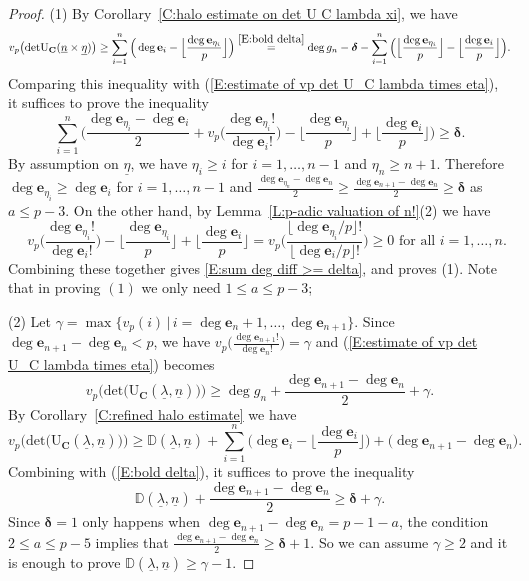 \documentclass[12pt]{amsart}
\theoremstyle{definition}
\numberwithin{equation}{subsection}
\def\DD{\mathbb{D}}
\def\bfe{\mathbf{e}}
\def\bfC{\mathbf{C}}
\def\rmU{\mathrm{U}}
\renewcommand{\det}{\mathrm{det}}
\begin{document}
\begin{proof}
(1) By Corollary~\ref{C:halo estimate on det U C lambda xi}, we have 
		$$
		v_p\big(\det \rmU_{\bfC}(\underline n \times  \underline \eta)\big) \geq  \sum_{i=1}^{n} \Big( \deg \bfe_i - \Big\lfloor \frac{\deg \bfe_{\eta_i}}p\Big\rfloor \Big)\stackrel{\eqref{E:bold delta}}=\deg g_n- \boldsymbol{\delta} -\sum_{i=1}^n\Big( \Big\lfloor \frac{\deg \bfe_{\eta_i}}p\Big\rfloor -\Big\lfloor\frac{\deg \bfe_{i}}p\Big\rfloor \Big).
		$$
		Comparing this inequality with (\ref{E:estimate of vp det U_C lambda times eta}), it suffices to prove the inequality
\begin{equation}
\label{E:sum deg diff >= delta}
\sum_{i=1}^n\bigg(\frac{\deg \bfe_{\eta_i} - \deg \bfe_{i}}2 +  v_p \Big( \frac{\deg \bfe_{\eta_i}!}{\deg \bfe_{i}!}\Big)- \Big\lfloor \frac{\deg \bfe_{\eta_i}}p\Big\rfloor +\Big\lfloor\frac{\deg \bfe_{i}}p\Big\rfloor \bigg) \geq \boldsymbol{\delta}.
\end{equation}
		By assumption on $\underline \eta$, we have $\eta_i\geq i$ for $i=1,\dots, n-1$ and $\eta_n\geq n+1$. Therefore $\deg\bfe_{\eta_i}\geq \deg \bfe_i$ for $i=1,\dots, n-1$ and $\frac{\deg \bfe_{\eta_n}-\deg \bfe_n}2\geq \frac{\deg \bfe_{n+1}-\deg \bfe_n}2 \geq \boldsymbol{\delta}$ as $a\leq p-3$. On the other hand, by Lemma~\ref{L:p-adic valuation of n!}(2)  we have 
		\[
		\quad v_p\Big( \frac{\deg \bfe_{\eta_i}!}{\deg \bfe_i!}\Big) - \Big\lfloor \frac{\deg \bfe_{\eta_i}}p\Big\rfloor +\Big\lfloor\frac{\deg \bfe_{i}}p\Big\rfloor = v_p\Big( \frac{\lfloor\deg \bfe_{\eta_i}/p\rfloor!}{\lfloor\deg  \bfe_i/p\rfloor!}\Big)\geq 0 \text{~for all~}i=1,\dots,n.
		\]
		Combining these together gives \eqref{E:sum deg diff >= delta}, and proves (1). Note that in proving $(1)$ we only need $1\leq a\leq p-3$;
        
(2) Let $\gamma=\max\{v_p(i)\,|\,i=\deg\bfe_n+1,\dots, \deg \bfe_{n+1} \}$. Since $\deg \bfe_{n+1}-\deg \bfe_n<p$, we have $v_p\big(\frac{\deg \bfe_{n+1}!}{\deg \bfe_n!} \big)=\gamma$ and (\ref{E:estimate of vp det U_C lambda times eta}) becomes
		\begin{equation}
		\label{E:lambda n+1 eta n}
		v_p\big( \det\big( \rmU_\bfC(\underline \lambda, \underline n)\big) \big) \geq \deg g_n + \frac{\deg \bfe_{n+1} - \deg\bfe_n}2 +\gamma.
		\end{equation}
		By Corollary~\ref{C:refined halo estimate} we have 
		$$
		v_p\big( \det\big( \rmU_\bfC(\underline \lambda, \underline n)\big) \big) \geq \DD(\underline \lambda, \underline n) + \sum_{i=1}^{n} \Big(\deg \bfe_i - \Big\lfloor \frac{\deg\bfe_i}p\Big\rfloor\Big)  + \big( \deg \bfe_{n+1}-\deg \bfe_n\big).
		$$
		Combining with (\ref{E:bold delta}), it suffices to prove the inequality
		$$
		\DD(\underline \lambda, \underline n) + \frac{\deg \bfe_{n+1} - \deg\bfe_n}2 \geq \boldsymbol{\delta} + \gamma.
		$$ 
		Since $\boldsymbol{\delta}  =1$ only happens when $\deg \bfe_{n+1} - \deg \bfe_n =p-1-a$, the condition $2\leq a \leq p-5$ implies that $ \frac{\deg \bfe_{n+1} - \deg\bfe_n}2 \geq \boldsymbol{\delta}+1$. So we can assume $\gamma\geq 2$ and it is enough to prove $\DD(\underline \lambda, \underline n)\geq \gamma-1$.
		

\end{proof}
\end{document}
